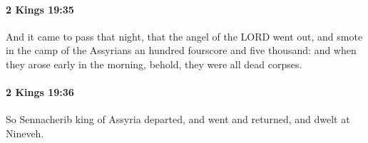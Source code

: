 		\paragraph{2 Kings 19:35} %
			\label{2KINGS-19-35}

			And it came to pass that night, that the angel of the LORD went out, and smote in the camp of the Assyrians an hundred fourscore and five thousand: and when they arose early in the morning, behold, they were all dead corpses.


		\paragraph{2 Kings 19:36} %
			\label{2KINGS-19-36}

			So Sennacherib king of Assyria departed, and went and returned, and dwelt at Nineveh.


